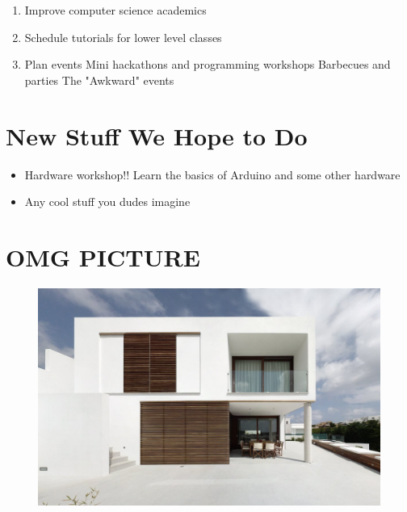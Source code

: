 \begin{enumerate}
	\item Improve computer science academics
	\item Schedule tutorials for lower level classes
	\item Plan events
		\subitem Mini hackathons and programming workshops
		\subitem Barbecues and parties
		\subitem The "Awkward" events
\end{enumerate}

\clearpage

\section{New Stuff We Hope to Do}

\begin{itemize}
	\item Hardware workshop!!  Learn the basics of Arduino and some other hardware
	\item Any cool stuff you dudes imagine
\end{itemize}

\clearpage

\section{OMG PICTURE}

\begin{figure}[H]
	\centering
	\includegraphics[width=.7\textwidth]{gfx/modern-minimalist-square-house-menorca-sun-shades-for-the-windows-ideas.jpg}
\end{figure}


